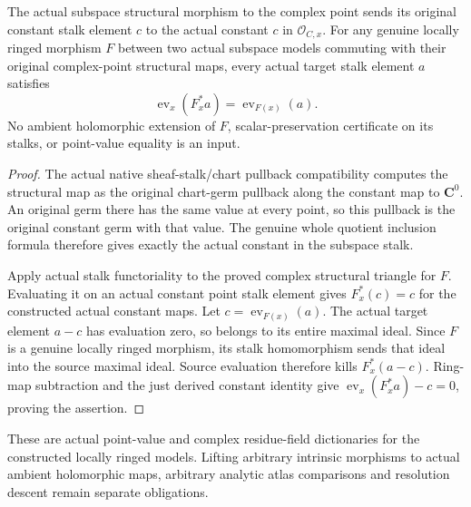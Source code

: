 \begin{theorem}
\label{hir:actual-analytic-subspace-scalar-map-point-values}
\leanok
The actual subspace structural morphism to the complex point sends its
original constant stalk element $c$ to the actual constant $c$ in
$\mathcal O_{C,x}$. For any genuine locally ringed morphism $F$ between
two actual subspace models commuting with their original complex-point
structural maps, every actual target stalk element $a$ satisfies
\[
 \operatorname{ev}_x(F_x^*a)=\operatorname{ev}_{F(x)}(a).
\]
No ambient holomorphic extension of $F$, scalar-preservation certificate
on its stalks, or point-value equality is an input.
\end{theorem}
\begin{proof}
The actual native sheaf-stalk/chart pullback compatibility computes the
structural map as the original chart-germ pullback along the constant
map to $\mathbf C^0$. An original germ there has the same value at every
point, so this pullback is the original constant germ with that value.
The genuine whole quotient inclusion formula therefore gives exactly
the actual constant in the subspace stalk.

Apply actual stalk functoriality to the proved complex structural
triangle for $F$. Evaluating it on an actual constant point stalk
element gives $F_x^*(c)=c$ for the constructed actual constant maps.
Let $c=\operatorname{ev}_{F(x)}(a)$. The actual target element $a-c$
has evaluation zero, so belongs to its entire maximal ideal. Since
$F$ is a genuine locally ringed morphism, its stalk homomorphism sends
that ideal into the source maximal ideal. Source evaluation therefore
kills $F_x^*(a-c)$. Ring-map subtraction and the just derived constant
identity give $\operatorname{ev}_x(F_x^*a)-c=0$, proving the assertion.
\end{proof}

These are actual point-value and complex residue-field dictionaries for
the constructed locally ringed models. Lifting arbitrary intrinsic
morphisms to actual ambient holomorphic maps, arbitrary analytic atlas
comparisons and resolution descent remain separate obligations.
